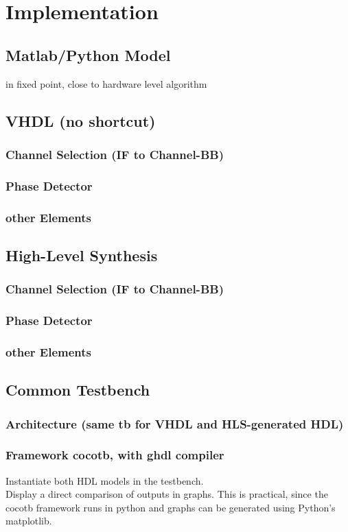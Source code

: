 \chapter{Implementation}
\label{cha:Implementation}
\section{Matlab/Python Model}
  in fixed point, close to hardware level algorithm

  \section{VHDL (no shortcut)}
  \subsection{Channel Selection (IF to Channel-BB)}
  \subsection{Phase Detector}
  \subsection{other Elements}

  \section{High-Level Synthesis}
  \subsection{Channel Selection (IF to Channel-BB)}
  \subsection{Phase Detector}
  \subsection{other Elements}

  \section{Common Testbench}
  \subsection{Architecture (same tb for VHDL and HLS-generated HDL)}
  \subsection{Framework cocotb, with ghdl compiler}
  Instantiate both HDL models in the testbench.\\
  Display a direct comparison of outputs in graphs. This is practical, since the cocotb framework runs in python and graphs can be generated using Python's matplotlib.

